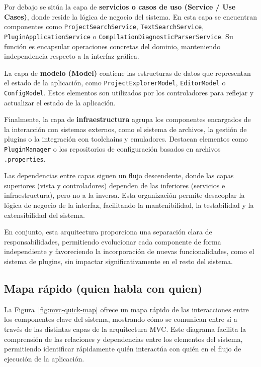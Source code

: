 \documentclass[../main.tex]{subfiles}
\begin{document}
\par{Por debajo se sitúa la capa de \textbf{servicios o casos de uso (Service / Use Cases)}, donde reside la lógica de negocio del sistema. En esta capa se encuentran componentes como \lstinline|ProjectSearchService|, \lstinline|TextSearchService|, \lstinline|PluginApplicationService| o \lstinline|CompilationDiagnosticParserService|. Su función es encapsular operaciones concretas del dominio, manteniendo independencia respecto a la interfaz gráfica.}

\par{La capa de \textbf{modelo (Model)} contiene las estructuras de datos que representan el estado de la aplicación, como \lstinline|ProjectExplorerModel|, \lstinline|EditorModel| o \lstinline|ConfigModel|. Estos elementos son utilizados por los controladores para reflejar y actualizar el estado de la aplicación.}

\clearpage
 
\par{Finalmente, la capa de \textbf{infraestructura} agrupa los componentes encargados de la interacción con sistemas externos, como el sistema de archivos, la gestión de plugins o la integración con toolchains y emuladores. Destacan elementos como \lstinline|PluginManager| o los repositorios de configuración basados en archivos \lstinline|.properties|.}

\par{Las dependencias entre capas siguen un flujo descendente, donde las capas superiores (vista y controladores) dependen de las inferiores (servicios e infraestructura), pero no a la inversa. Esta organización permite desacoplar la lógica de negocio de la interfaz, facilitando la mantenibilidad, la testabilidad y la extensibilidad del sistema.}

\par{En conjunto, esta arquitectura proporciona una separación clara de responsabilidades, permitiendo evolucionar cada componente de forma independiente y favoreciendo la incorporación de nuevas funcionalidades, como el sistema de plugins, sin impactar significativamente en el resto del sistema.}

\subsection{Mapa rápido (quien habla con quien)}

\par{La Figura~\ref{fig:mvc-quick-map} ofrece un mapa rápido de las interacciones entre los componentes clave del sistema, mostrando cómo se comunican entre sí a través de las distintas capas de la arquitectura MVC. Este diagrama facilita la comprensión de las relaciones y dependencias entre los elementos del sistema, permitiendo identificar rápidamente quién interactúa con quién en el flujo de ejecución de la aplicación.}
\end{document}
